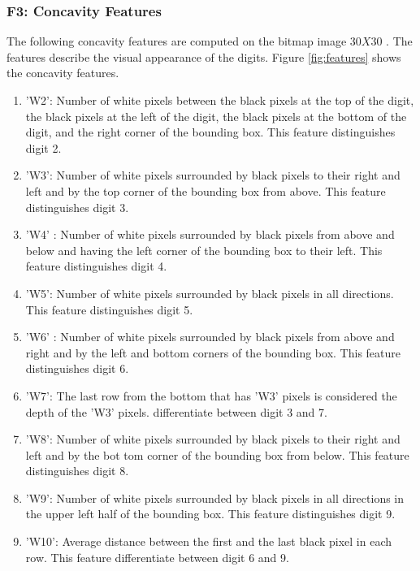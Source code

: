 \documentclass[10pt]{IEEEtran}
\begin{document}
\subsubsection{ F3: Concavity Features}
\label{sec:F3}
The following concavity features are computed on the bitmap image $30X30$  . The features describe the visual appearance of the digits\cite{Abdelazeem2009}. Figure \ref{fig:features} shows the concavity features.
\begin{enumerate}
    \item 'W2':  Number of white pixels between the black pixels at the top of the digit, the black pixels at the left of the digit, the black pixels at the bottom of the digit, and the right corner of the bounding box. This feature distinguishes digit 2.
     \item    'W3':  Number of white pixels surrounded by black pixels to their right and left and by the top corner of the bounding box from above. This feature distinguishes digit 3.
   \item 'W4' : Number of white pixels surrounded by black pixels from above and below and having the left corner of the bounding box to their left. This feature distinguishes digit 4.
    \item 'W5': Number of white pixels surrounded by black pixels in all directions. This feature distinguishes digit 5.
     \item  'W6' : Number of white pixels surrounded by black pixels from above and right and by the left and bottom corners of the bounding box. This feature distinguishes digit 6.
      \item  'W7':  The last row from the bottom that has 'W3' pixels is considered the depth of the 'W3' pixels. differentiate between digit 3 and 7.
  \item  'W8':  Number of white pixels surrounded by black pixels to their right and left and by the bot tom corner of the bounding box from below. This feature distinguishes digit 8.
  \item 'W9':  Number of white pixels surrounded by black pixels in all directions in the upper left half of the bounding box. This feature distinguishes digit 9.
    \item 'W10': Average distance between the first and the last black pixel in each row. This feature differentiate between digit 6 and 9.
\end{enumerate}
\end{document}
